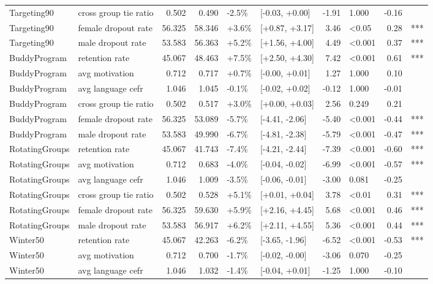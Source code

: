 \begin{longtable}[t]{llrrllrlrl}
Targeting90 & cross group tie ratio & 0.502 & 0.490 & -2.5\% & {}[-0.03, +0.00] & -1.91 & 1.000 & -0.16 & \\
Targeting90 & female dropout rate & 56.325 & 58.346 & +3.6\% & {}[+0.87, +3.17] & 3.46 & <0.05 & 0.28 & ***\\
\addlinespace
Targeting90 & male dropout rate & 53.583 & 56.363 & +5.2\% & {}[+1.56, +4.00] & 4.49 & <0.001 & 0.37 & ***\\
BuddyProgram & retention rate & 45.067 & 48.463 & +7.5\% & {}[+2.50, +4.30] & 7.42 & <0.001 & 0.61 & ***\\
BuddyProgram & avg motivation & 0.712 & 0.717 & +0.7\% & {}[-0.00, +0.01] & 1.27 & 1.000 & 0.10 & \\
BuddyProgram & avg language cefr & 1.046 & 1.045 & -0.1\% & {}[-0.02, +0.02] & -0.12 & 1.000 & -0.01 & \\
BuddyProgram & cross group tie ratio & 0.502 & 0.517 & +3.0\% & {}[+0.00, +0.03] & 2.56 & 0.249 & 0.21 & \\
\addlinespace
BuddyProgram & female dropout rate & 56.325 & 53.089 & -5.7\% & {}[-4.41, -2.06] & -5.40 & <0.001 & -0.44 & ***\\
BuddyProgram & male dropout rate & 53.583 & 49.990 & -6.7\% & {}[-4.81, -2.38] & -5.79 & <0.001 & -0.47 & ***\\
RotatingGroups & retention rate & 45.067 & 41.743 & -7.4\% & {}[-4.21, -2.44] & -7.39 & <0.001 & -0.60 & ***\\
RotatingGroups & avg motivation & 0.712 & 0.683 & -4.0\% & {}[-0.04, -0.02] & -6.99 & <0.001 & -0.57 & ***\\
RotatingGroups & avg language cefr & 1.046 & 1.009 & -3.5\% & {}[-0.06, -0.01] & -3.00 & 0.081 & -0.25 & \\
\addlinespace
RotatingGroups & cross group tie ratio & 0.502 & 0.528 & +5.1\% & {}[+0.01, +0.04] & 3.78 & <0.01 & 0.31 & ***\\
RotatingGroups & female dropout rate & 56.325 & 59.630 & +5.9\% & {}[+2.16, +4.45] & 5.68 & <0.001 & 0.46 & ***\\
RotatingGroups & male dropout rate & 53.583 & 56.917 & +6.2\% & {}[+2.11, +4.55] & 5.36 & <0.001 & 0.44 & ***\\
Winter50 & retention rate & 45.067 & 42.263 & -6.2\% & {}[-3.65, -1.96] & -6.52 & <0.001 & -0.53 & ***\\
Winter50 & avg motivation & 0.712 & 0.700 & -1.7\% & {}[-0.02, -0.00] & -3.06 & 0.070 & -0.25 & \\
\addlinespace
Winter50 & avg language cefr & 1.046 & 1.032 & -1.4\% & {}[-0.04, +0.01] & -1.25 & 1.000 & -0.10 & \\

\end{longtable}

